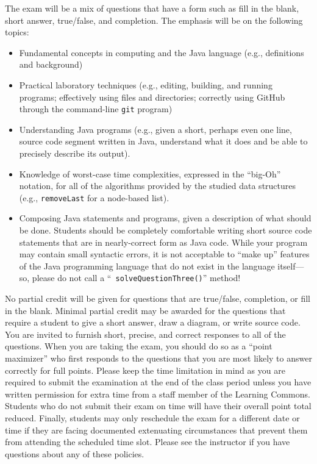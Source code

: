 \documentclass[11pt]{article}
\newcommand{\program}[1]{\lstinline{#1}}
\begin{document}
\noindent The exam will be a mix of questions that have a form such as fill in
the blank, short answer, true/false, and completion. The emphasis will be on the
following topics:

\vspace*{-.05in}
\begin{itemize}

  \itemsep 0in

  \item Fundamental concepts in computing and the Java language (e.g.,
    definitions and background)

  \item Practical laboratory techniques (e.g., editing, building, and running
    programs; effectively using files and directories; correctly using GitHub
    through the command-line {\tt git} program)

  \item Understanding Java programs (e.g., given a short, perhaps even one line,
    source code segment written in Java, understand what it does and be able to
    precisely describe its output).

  \item Knowledge of worst-case time complexities, expressed in the ``big-Oh''
    notation, for all of the algorithms provided by the studied data structures
    (e.g., \program{removeLast} for a node-based list).

  \item Composing Java statements and programs, given a description of what
    should be done. Students should be completely comfortable writing short
    source code statements that are in nearly-correct form as Java code. While
    your program may contain small syntactic errors, it is not acceptable to
    ``make up'' features of the Java programming language that do not exist in
    the language itself---so, please do not call a ``{\tt
    solveQuestionThree()}'' method!

\end{itemize}

\noindent No partial credit will be given for questions that are true/false,
completion, or fill in the blank. Minimal partial credit may be awarded for the
questions that require a student to give a short answer, draw a diagram, or
write source code. You are invited to furnish short, precise, and correct
responses to all of the questions. When you are taking the exam, you should do
so as a ``point maximizer'' who first responds to the questions that you are
most likely to answer correctly for full points. Please keep the time limitation
in mind as you are required to submit the examination at the end of the class
period unless you have written permission for extra time from a staff member of
the Learning Commons. Students who do not submit their exam on time will have
their overall point total reduced. Finally, students may only reschedule the
exam for a different date or time if they are facing documented extenuating
circumstances that prevent them from attending the scheduled time slot. Please
see the instructor if you have questions about any of these policies.
\end{document}
